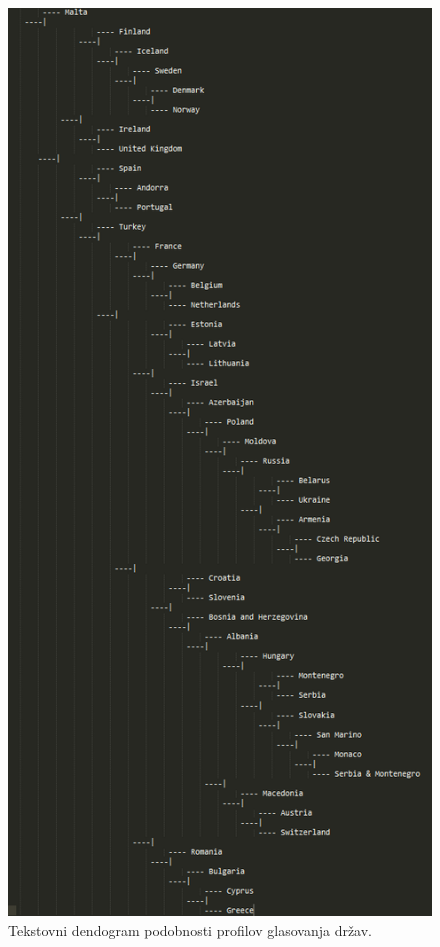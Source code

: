 \documentclass[a4paper,11pt]{article}
\begin{document}
\begin{figure}[htbp]
\begin{center}
\includegraphics[scale=0.7]{dendogram-slika.png}
\caption{Tekstovni dendogram podobnosti profilov glasovanja držav.}
\label{slika1}
\end{center}
\end{figure}
\end{document}
